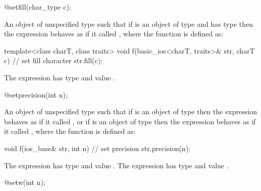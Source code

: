 %
\begin{itemdecl}
@\unspec@ setfill(char_type c);
\end{itemdecl}

\begin{itemdescr}
\pnum
\returns
An object of unspecified type such that if
is an object of type
and  has type
then the expression
behaves as if it called
, where the function  is defined as:

\begin{codeblock}
template<class charT, class traits>
void f(basic_ios<charT, traits>& str, charT c) {
  // set fill character
  str.fill(c);
}
\end{codeblock}

The expression
has type
and value
.
\end{itemdescr}

%
\begin{itemdecl}
@\unspec@ setprecision(int n);
\end{itemdecl}

\begin{itemdescr}
\pnum
\returns
An object of unspecified type such that if
is an object of type
then the expression
behaves as if it called
,
or if
is an object of type
then the expression
behaves as if it called
, where the function  is defined as:

\begin{codeblock}
void f(ios_base& str, int n) {
  // set precision
  str.precision(n);
}
\end{codeblock}

The expression
has type
and value
.
The expression
has type
and value
.
\end{itemdescr}

%
\begin{itemdecl}
@\unspec@ setw(int n);
\end{itemdecl}

